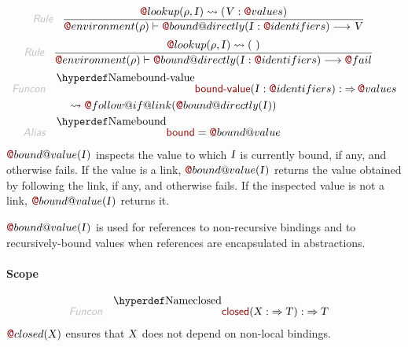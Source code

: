\begin{align*}
  \KEY{Rule} \quad
    & \RULE{
        \FUN@lookup
          (  \VAR{\ensuremath{\rho}}, 
                 \VAR{I} ) \leadsto 
          (  \VAR{V} : \FUN@values )
      }{
        \FUN@environment (  \VAR{\ensuremath{\rho}} ) \vdash \FUN@bound@directly
                      (  \VAR{I} : \FUN@identifiers ) \TRANS 
          \VAR{V}
      }
\end{align*}
\begin{align*}
  \KEY{Rule} \quad
    & \RULE{
        \FUN@lookup
          (  \VAR{\ensuremath{\rho}}, 
                 \VAR{I} ) \leadsto 
          (   \  )
      }{
        \FUN@environment (  \VAR{\ensuremath{\rho}} ) \vdash \FUN@bound@directly
                      (  \VAR{I} : \FUN@identifiers ) \TRANS 
          \FUN@fail
      }
\end{align*}
\begin{align*}
  \KEY{Funcon} \quad
  & \FUNDEC{bound-value}(
                     \VAR{I} : \FUN@identifiers) 
    :  \TO \FUN@values \\&\quad
    \leadsto \FUN@follow@if@link
               (  \FUN@bound@directly
                       (  \VAR{I} ) )
\\
  \KEY{Alias} \quad
  & \FUNDEC{bound} = \FUN@bound@value
\end{align*}
$\FUN@bound@value
    (  \VAR{I} )$ inspects the value to which $\VAR{I}$ is currently bound, if any,
   and otherwise fails. If the value is a link, $\FUN@bound@value
    (  \VAR{I} )$ returns the
   value obtained by following the link, if any, and otherwise fails. If the 
   inspected value is not a link, $\FUN@bound@value
    (  \VAR{I} )$ returns it.

$\FUN@bound@value
    (  \VAR{I} )$ is used for references to non-recursive bindings and to
   recursively-bound values when references are encapsulated in abstractions.

\paragraph{Scope}\hypertarget{scope}{}\label{scope}

\begin{align*}
  \KEY{Funcon} \quad
  & \FUNDEC{closed}(
                     \VAR{X} :  \TO \VAR{T}) 
    :  \TO \VAR{T} 
\end{align*}
$\FUN@closed
    (  \VAR{X} )$ ensures that $\VAR{X}$ does not depend on non-local bindings.

